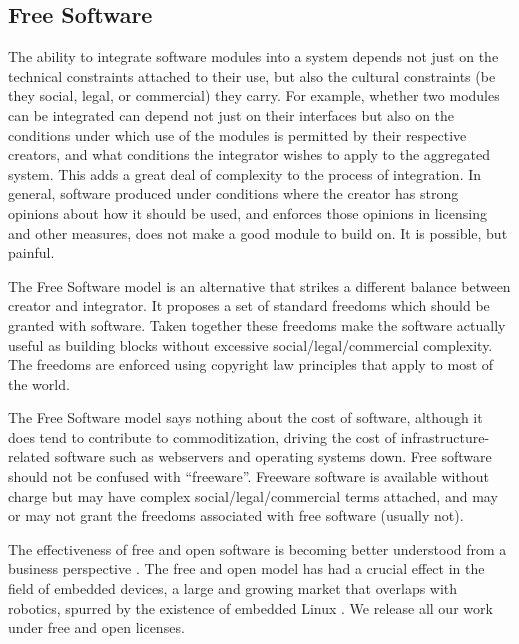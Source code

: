 \subsection{Free Software}

The ability to integrate software modules into a system
depends not just on the technical constraints attached
to their use, but also the cultural constraints
(be they social, legal, or commercial) they carry.
%
For example, whether two modules can be integrated
can depend not just on their interfaces but also on
the conditions under which use of the modules
is permitted by their respective creators,
and what conditions the integrator wishes to 
apply to the aggregated system.  
%
This adds a great deal of complexity to the process
of integration.
%
In general, software produced under conditions where the 
creator has strong opinions about how it should be 
used, and enforces those opinions in licensing
and other measures, does not make a good module 
to build on.
%
It is possible, but painful.

The Free Software model is an alternative that strikes a different
balance between creator and integrator.  It proposes a set of standard
freedoms which should be granted with software. Taken together 
these freedoms make
the software actually useful as building blocks without excessive
social/legal/commercial complexity.  The freedoms are enforced using
copyright law principles that apply to most of the world.

The Free Software model says nothing about the cost of software,
although it does tend to contribute to commoditization, driving the
cost of infrastructure-related software such as webservers and
operating systems down.  Free software should not be confused with
``freeware''.  Freeware software is available without charge but may
have complex social/legal/commercial terms attached, and may
or may not grant the freedoms associated with free software
(usually not).

The effectiveness of free and open software is 
becoming better understood from a business
perspective \cite{vonkrogh2006promise}.
%
The free and open model has had a crucial 
effect in the field of embedded devices,
a large and growing market that overlaps
with robotics, spurred by the existence
of embedded Linux \cite{henkel2006selective}.
%
We release all our work under free and open licenses.



